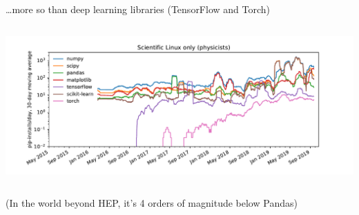 \documentclass[aspectratio=169]{beamer}
\begin{document}
\begin{frame}{\ldots more so than deep learning libraries (TensorFlow and Torch)}
\vspace{0.5 cm}
\begin{columns}
\includegraphics[width=\linewidth]{pip-scilinux-ml.pdf}
\end{columns}
\end{frame}

\begin{frame}{(In the world beyond HEP, it's 4 orders of magnitude below Pandas)}
\vspace{0.5 cm}
\begin{columns}
\end{columns}
\end{frame}
\end{document}
